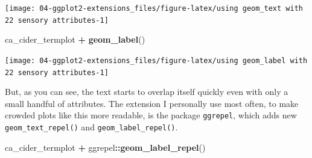 \documentclass[
]{book}
\newenvironment{Shaded}{\begin{snugshade}}{\end{snugshade}}
\newcommand{\AttributeTok}[1]{\textcolor[rgb]{0.13,0.29,0.53}{#1}}
\newcommand{\CommentTok}[1]{\textcolor[rgb]{0.56,0.35,0.01}{\textit{#1}}}
\newcommand{\FunctionTok}[1]{\textcolor[rgb]{0.13,0.29,0.53}{\textbf{#1}}}
\newcommand{\NormalTok}[1]{#1}
\newcommand{\OtherTok}[1]{\textcolor[rgb]{0.56,0.35,0.01}{#1}}
\newcommand{\SpecialCharTok}[1]{\textcolor[rgb]{0.81,0.36,0.00}{\textbf{#1}}}
\newcommand{\StringTok}[1]{\textcolor[rgb]{0.31,0.60,0.02}{#1}}
\begin{document}
\begin{Shaded}
\end{Shaded}

\begin{center}\texttt{[image: 04-ggplot2-extensions\_files/figure-latex/using geom\_text with 22 sensory attributes-1]} \end{center}

\begin{Shaded}
\begin{Highlighting}[]
\NormalTok{ca\_cider\_termplot }\SpecialCharTok{+}
  \FunctionTok{geom\_label}\NormalTok{()}
\end{Highlighting}
\end{Shaded}

\begin{center}\texttt{[image: 04-ggplot2-extensions\_files/figure-latex/using geom\_label with 22 sensory attributes-1]} \end{center}

But, as you can see, the text starts to overlap itself quickly even with only a small handful of attributes. The extension I personally use most often, to make crowded plots like this more readable, is the package \texttt{ggrepel}, which adds new \texttt{geom\_text\_repel()} and \texttt{geom\_label\_repel()}.

\begin{Shaded}
\begin{Highlighting}[]
\NormalTok{ca\_cider\_termplot }\SpecialCharTok{+}
\NormalTok{  ggrepel}\SpecialCharTok{::}\FunctionTok{geom\_label\_repel}\NormalTok{()}
\end{Highlighting}
\end{Shaded}
\end{document}
